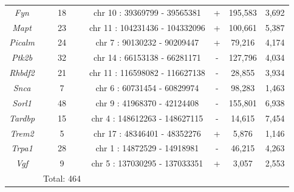 \begin{table}[!htp]
\begin{tabular}{@{}cccccc@{}}
		\textit{Fyn}    & 18         & chr  10 : 39369799 -   39565381   & + & 195,583 & 3,692  \\
		\textit{Mapt}   & 23         & chr  11 : 104231436 -   104332096 & + & 100,661 & 5,387  \\
		\textit{Picalm} & 24         & chr  7 : 90130232 -   90209447    & + & 79,216  & 4,174  \\
		\textit{Ptk2b}  & 32         & chr  14 : 66153138 -   66281171   & - & 127,796 & 4,034  \\
		\textit{Rhbdf2} & 21         & chr  11 : 116598082 -   116627138 & - & 28,855  & 3,934  \\
		\textit{Snca}   & 7          & chr  6 : 60731454 -   60829974    & - & 98,283  & 1,463  \\
		\textit{Sorl1}  & 48         & chr  9 : 41968370 -   42124408    & - & 155,801 & 6,938  \\
		\textit{Tardbp} & 15         & chr  4 : 148612263 -   148627115  & - & 14,615  & 7,454  \\
		\textit{Trem2}  & 5          & chr  17 : 48346401 -   48352276   & + & 5,876   & 1,146  \\
		\textit{Trpa1}  & 28         & chr  1 : 14872529 -   14918981    & - & 46,215  & 4,263  \\
		\textit{Vgf}    & 9          & chr  5 : 137030295 -   137033351  & + & 3,057   & 2,553  \\
		& Total: 464 &                                   &   &         &        \\ \bottomrule
	\end{tabular}
\end{table}


